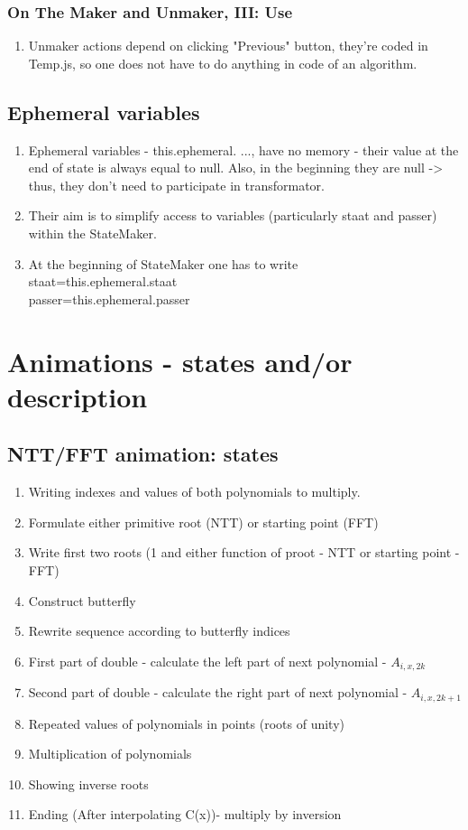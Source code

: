 \documentclass[12pt]{article}
\begin{document}
\subsubsection{On The Maker and Unmaker, III: Use}
\begin {enumerate}
	\item Unmaker actions depend on clicking "Previous" button, they're coded in Temp.js, so one does not have to do anything in code of an algorithm.
\end {enumerate}
\subsection {Ephemeral variables}
\begin{enumerate}
	\item Ephemeral variables - this.ephemeral. ..., have no memory - their value at the end of state is always equal to null. Also, in the beginning they are null -> thus, they don't need to participate in transformator.
	\item Their aim is to simplify access to variables (particularly staat and passer) within the StateMaker.
	\item At the beginning of StateMaker one has to write\\
	staat=this.ephemeral.staat\\
	passer=this.ephemeral.passer
\end{enumerate}


\section{Animations - states and/or description}
\subsection{NTT/FFT animation: states}
\begin {enumerate}
	\item Writing indexes and values of both polynomials to multiply.
	\item Formulate either primitive root (NTT) or starting point (FFT)
	\item Write first two roots (1 and either function of proot - NTT or starting point - FFT)
	\item Construct butterfly
	\item Rewrite sequence according to butterfly indices
	\item First part of double - calculate the left part of next polynomial - \(A_{i,x,2k}\)
	\item Second part of double - calculate the right part of next polynomial - \(A_{i,x,2k+1}\)
	\item Repeated values of polynomials in points (roots of unity)
	\item Multiplication of polynomials
	\item Showing inverse roots
	\item Ending (After interpolating C(x))- multiply by inversion
\end {enumerate}
\end{document}
